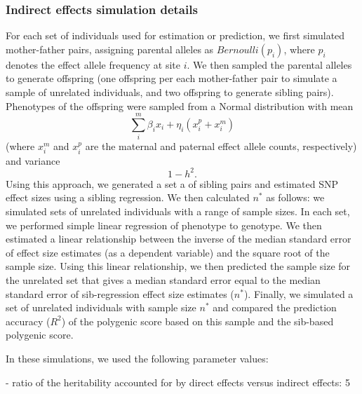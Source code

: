 \documentclass[hidelinks, 12pt]{article}
\begin{document}
\vspace{0.5cm}


\subsubsection{Indirect effects simulation details}
\label{indirect_sim_details}
For each set of individuals used for estimation or prediction, we first simulated mother-father pairs, assigning parental alleles as $Bernoulli(p_i)$, where $p_i$ denotes the effect allele frequency at site $i$.  We then sampled the parental alleles to generate offspring (one offspring per each mother-father pair to simulate a sample of unrelated individuals, and two offspring to generate sibling pairs). Phenotypes of the offspring were sampled from a Normal distribution with mean
$$\sum_i^m\beta_ix_i+\eta_i({x}_i^p+{x}_i^m)$$ (where ${x}_i^m$ and ${x}_i^p$ are the maternal and paternal effect allele counts, respectively) and variance 
$$1-h^2.$$
Using this approach, we generated a set a of sibling pairs and estimated SNP effect sizes using a sibling regression. We then calculated $n^*$ as follows: we simulated sets of unrelated individuals with a range of sample sizes. In each set, we performed simple linear regression of phenotype to genotype.  We then estimated a linear relationship between the inverse of the median standard error of effect size estimates (as a dependent variable) and the square root of the sample size.  Using this linear relationship, we then predicted the sample size for the unrelated set that gives a median standard error equal to the median standard error of sib-regression effect size estimates ($n^*$).  Finally, we simulated a set of unrelated individuals with sample size $n^*$ and compared the prediction accuracy ($R^2$) of the polygenic score based on this sample and the sib-based polygenic score. 

In these simulations, we used the following parameter values:

- ratio of the heritability accounted for by direct effects versus indirect effects: 5
\end{document}
